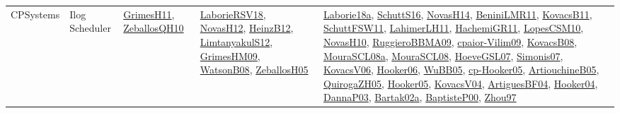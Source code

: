 {\begin{longtable}{lp{3cm}>{\raggedright}p{6cm}>{\raggedright}p{6cm}p{8cm}}
CPSystems & Ilog Scheduler & \href{papers/GrimesH11.pdf}{GrimesH11}\cite{GrimesH11}, \href{articles/ZeballosQH10.pdf}{ZeballosQH10}\cite{ZeballosQH10} & \href{articles/LaborieRSV18.pdf}{LaborieRSV18}\cite{LaborieRSV18}, \href{articles/NovasH12.pdf}{NovasH12}\cite{NovasH12}, \href{papers/HeinzB12.pdf}{HeinzB12}\cite{HeinzB12}, \href{articles/LimtanyakulS12.pdf}{LimtanyakulS12}\cite{LimtanyakulS12}, \href{papers/GrimesHM09.pdf}{GrimesHM09}\cite{GrimesHM09}, \href{papers/WatsonB08.pdf}{WatsonB08}\cite{WatsonB08}, \href{articles/ZeballosH05.pdf}{ZeballosH05}\cite{ZeballosH05} & \href{papers/Laborie18a.pdf}{Laborie18a}\cite{Laborie18a}, \href{papers/SchuttS16.pdf}{SchuttS16}\cite{SchuttS16}, \href{articles/NovasH14.pdf}{NovasH14}\cite{NovasH14}, \href{articles/BeniniLMR11.pdf}{BeniniLMR11}\cite{BeniniLMR11}, \href{articles/KovacsB11.pdf}{KovacsB11}\cite{KovacsB11}, \href{articles/SchuttFSW11.pdf}{SchuttFSW11}\cite{SchuttFSW11}, \href{papers/LahimerLH11.pdf}{LahimerLH11}\cite{LahimerLH11}, \href{articles/HachemiGR11.pdf}{HachemiGR11}\cite{HachemiGR11}, \href{articles/LopesCSM10.pdf}{LopesCSM10}\cite{LopesCSM10}, \href{articles/NovasH10.pdf}{NovasH10}\cite{NovasH10}, \href{articles/RuggieroBBMA09.pdf}{RuggieroBBMA09}\cite{RuggieroBBMA09}, \href{papers/cpaior-Vilim09.pdf}{cpaior-Vilim09}\cite{cpaior-Vilim09}, \href{articles/KovacsB08.pdf}{KovacsB08}\cite{KovacsB08}, \href{papers/MouraSCL08a.pdf}{MouraSCL08a}\cite{MouraSCL08a}, \href{papers/MouraSCL08.pdf}{MouraSCL08}\cite{MouraSCL08}, \href{papers/HoeveGSL07.pdf}{HoeveGSL07}\cite{HoeveGSL07}, \href{articles/Simonis07.pdf}{Simonis07}\cite{Simonis07}, \href{papers/KovacsV06.pdf}{KovacsV06}\cite{KovacsV06}, \href{articles/Hooker06.pdf}{Hooker06}\cite{Hooker06}, \href{papers/WuBB05.pdf}{WuBB05}\cite{WuBB05}, \href{papers/cp-Hooker05.pdf}{cp-Hooker05}\cite{cp-Hooker05}, \href{papers/ArtiouchineB05.pdf}{ArtiouchineB05}\cite{ArtiouchineB05}, \href{papers/QuirogaZH05.pdf}{QuirogaZH05}\cite{QuirogaZH05}, \href{articles/Hooker05.pdf}{Hooker05}\cite{Hooker05}, \href{papers/KovacsV04.pdf}{KovacsV04}\cite{KovacsV04}, \href{papers/ArtiguesBF04.pdf}{ArtiguesBF04}\cite{ArtiguesBF04}, \href{papers/Hooker04.pdf}{Hooker04}\cite{Hooker04}, \href{papers/DannaP03.pdf}{DannaP03}\cite{DannaP03}, \href{papers/Bartak02a.pdf}{Bartak02a}\cite{Bartak02a}, \href{articles/BaptisteP00.pdf}{BaptisteP00}\cite{BaptisteP00}, \href{articles/Zhou97.pdf}{Zhou97}\cite{Zhou97}\\

\end{longtable}}
